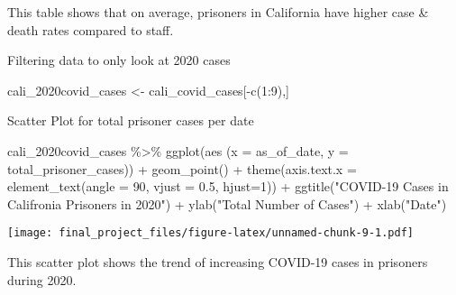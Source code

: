 \documentclass[
]{article}
\newenvironment{Shaded}{\begin{snugshade}}{\end{snugshade}}
\newcommand{\AttributeTok}[1]{\textcolor[rgb]{0.77,0.63,0.00}{#1}}
\newcommand{\DecValTok}[1]{\textcolor[rgb]{0.00,0.00,0.81}{#1}}
\newcommand{\FloatTok}[1]{\textcolor[rgb]{0.00,0.00,0.81}{#1}}
\newcommand{\FunctionTok}[1]{\textcolor[rgb]{0.00,0.00,0.00}{#1}}
\newcommand{\NormalTok}[1]{#1}
\newcommand{\OtherTok}[1]{\textcolor[rgb]{0.56,0.35,0.01}{#1}}
\newcommand{\SpecialCharTok}[1]{\textcolor[rgb]{0.00,0.00,0.00}{#1}}
\newcommand{\StringTok}[1]{\textcolor[rgb]{0.31,0.60,0.02}{#1}}
\begin{document}
This table shows that on average, prisoners in California have higher
case \& death rates compared to staff.

Filtering data to only look at 2020 cases

\begin{Shaded}
\begin{Highlighting}[]
\NormalTok{cali\_2020covid\_cases }\OtherTok{\textless{}{-}}\NormalTok{ cali\_covid\_cases[}\SpecialCharTok{{-}}\FunctionTok{c}\NormalTok{(}\DecValTok{1}\SpecialCharTok{:}\DecValTok{9}\NormalTok{),]}
\end{Highlighting}
\end{Shaded}

Scatter Plot for total prisoner cases per date

\begin{Shaded}
\begin{Highlighting}[]
\NormalTok{cali\_2020covid\_cases }\SpecialCharTok{\%\textgreater{}\%}
  \FunctionTok{ggplot}\NormalTok{(aes}
\NormalTok{         (}\AttributeTok{x =}\NormalTok{ as\_of\_date,}
           \AttributeTok{y =}\NormalTok{ total\_prisoner\_cases)) }\SpecialCharTok{+}
  \FunctionTok{geom\_point}\NormalTok{() }\SpecialCharTok{+}
  \FunctionTok{theme}\NormalTok{(}\AttributeTok{axis.text.x =} \FunctionTok{element\_text}\NormalTok{(}\AttributeTok{angle =} \DecValTok{90}\NormalTok{, }\AttributeTok{vjust =} \FloatTok{0.5}\NormalTok{, }\AttributeTok{hjust=}\DecValTok{1}\NormalTok{)) }\SpecialCharTok{+}
  \FunctionTok{ggtitle}\NormalTok{(}\StringTok{"COVID{-}19 Cases in Califronia Prisoners in 2020"}\NormalTok{) }\SpecialCharTok{+}
  \FunctionTok{ylab}\NormalTok{(}\StringTok{"Total Number of Cases"}\NormalTok{) }\SpecialCharTok{+}
  \FunctionTok{xlab}\NormalTok{(}\StringTok{"Date"}\NormalTok{) }
\end{Highlighting}
\end{Shaded}

\texttt{[image: final\_project\_files/figure-latex/unnamed-chunk-9-1.pdf]}

This scatter plot shows the trend of increasing COVID-19 cases in
prisoners during 2020.
\end{document}
